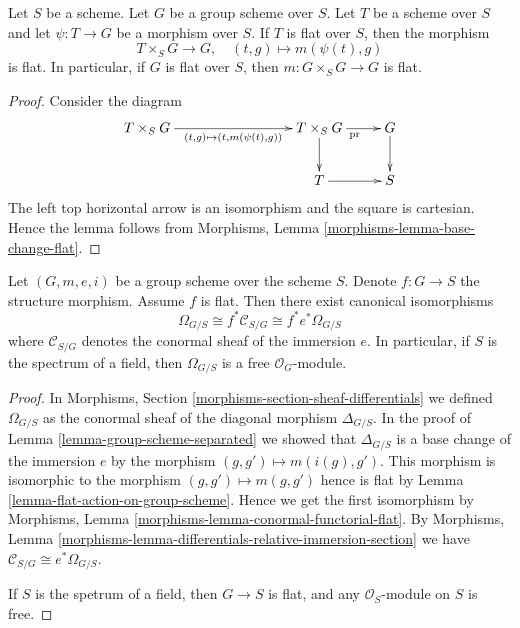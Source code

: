 \begin{lemma}
\label{lemma-flat-action-on-group-scheme}
Let $S$ be a scheme.
Let $G$ be a group scheme over $S$.
Let $T$ be a scheme over $S$ and let $\psi : T \to G$ be a morphism over $S$.
If $T$ is flat over $S$, then the morphism
$$
T \times_S G \longrightarrow G, \quad
(t, g) \longmapsto m(\psi(t), g)
$$
is flat. In particular, if $G$ is flat over $S$, then
$m : G \times_S G \to G$ is flat.
\end{lemma}

\begin{proof}
Consider the diagram
$$
\xymatrix{
T \times_S G \ar[rrr]_{(t, g) \mapsto (t, m(\psi(t), g))} & & &
T \times_S G \ar[r]_{\text{pr}} \ar[d] &
G \ar[d] \\
& & &
T \ar[r] &
S
}
$$
The left top horizontal arrow is an isomorphism and the
square is cartesian. Hence the lemma follows from
Morphisms, Lemma \ref{morphisms-lemma-base-change-flat}.
\end{proof}

\begin{lemma}
\label{lemma-group-scheme-module-differentials}
Let $(G, m, e, i)$ be a group scheme over the scheme $S$.
Denote $f : G \to S$ the structure morphism. Assume $f$ is flat.
Then there exist canonical isomorphisms
$$
\Omega_{G/S} \cong f^*\mathcal{C}_{S/G} \cong f^*e^*\Omega_{G/S}
$$
where $\mathcal{C}_{S/G}$ denotes the conormal sheaf of the
immersion $e$. In particular, if $S$ is the spectrum of a field, then
$\Omega_{G/S}$ is a free $\mathcal{O}_G$-module.
\end{lemma}

\begin{proof}
In
Morphisms, Section \ref{morphisms-section-sheaf-differentials}
we defined $\Omega_{G/S}$ as the conormal sheaf of the
diagonal morphism $\Delta_{G/S}$. In the proof of
Lemma \ref{lemma-group-scheme-separated}
we showed that $\Delta_{G/S}$ is a base change of the immersion $e$
by the morphism $(g, g') \mapsto m(i(g), g')$. This morphism
is isomorphic to the morphism $(g, g') \mapsto m(g, g')$
hence is flat by
Lemma \ref{lemma-flat-action-on-group-scheme}.
Hence we get the first isomorphism by
Morphisms, Lemma \ref{morphisms-lemma-conormal-functorial-flat}.
By
Morphisms, Lemma \ref{morphisms-lemma-differentials-relative-immersion-section}
we have $\mathcal{C}_{S/G} \cong e^*\Omega_{G/S}$.

\medskip\noindent
If $S$ is the spetrum of a field, then $G \to S$ is flat, and
any $\mathcal{O}_S$-module on $S$ is free.
\end{proof}






